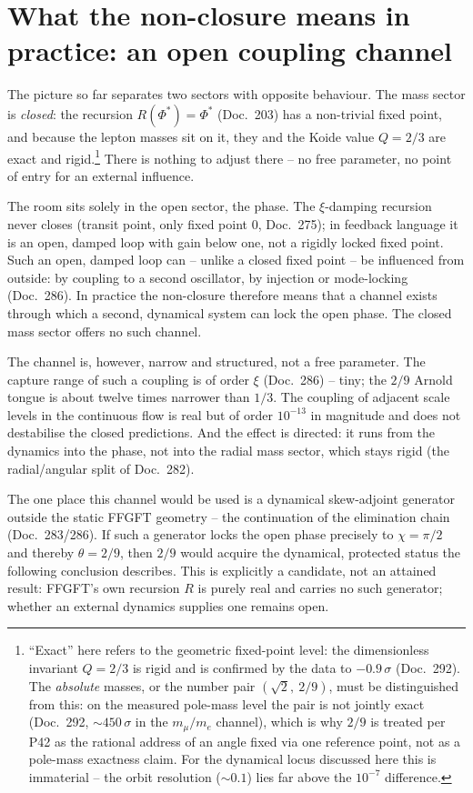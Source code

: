 \section{What the non-closure means in practice: an open coupling channel}
The picture so far separates two sectors with opposite behaviour. The mass sector is
\emph{closed}: the recursion $R(\Phi^*)=\Phi^*$ (Doc.~203) has a non-trivial fixed point, and
because the lepton masses sit on it, they and the Koide value $Q=2/3$ are exact and rigid.\footnote{\enquote{Exact} here refers to the geometric fixed-point level: the dimensionless invariant $Q=2/3$ is rigid and is confirmed by the data to $-0.9\,\sigma$ (Doc.~292). The \emph{absolute} masses, or the number pair $(\sqrt2,\ 2/9)$, must be distinguished from this: on the measured pole-mass level the pair is not jointly exact (Doc.~292, $\sim450\,\sigma$ in the $m_\mu/m_e$ channel), which is why $2/9$ is treated per P42 as the rational address of an angle fixed via one reference point, not as a pole-mass exactness claim. For the dynamical locus discussed here this is immaterial -- the orbit resolution ($\sim0.1$) lies far above the $10^{-7}$ difference.} There
is nothing to adjust there -- no free parameter, no point of entry for an external influence.

The room sits solely in the open sector, the phase. The $\xi$-damping recursion never closes
(transit point, only fixed point $0$, Doc.~275); in feedback language it is an open, damped loop
with gain below one, not a rigidly locked fixed point. Such an open, damped loop can -- unlike a
closed fixed point -- be influenced from outside: by coupling to a second oscillator, by injection
or mode-locking (Doc.~286). In practice the non-closure therefore means that a channel exists
through which a second, dynamical system can lock the open phase. The closed mass sector offers no
such channel.

The channel is, however, narrow and structured, not a free parameter. The capture range of such a
coupling is of order $\xi$ (Doc.~286) -- tiny; the $2/9$ Arnold tongue is about twelve times
narrower than $1/3$. The coupling of adjacent scale levels in the continuous flow is real but of
order $10^{-13}$ in magnitude and does not destabilise the closed predictions. And the effect is
directed: it runs from the dynamics into the phase, not into the radial mass sector, which stays
rigid (the radial/angular split of Doc.~282).

The one place this channel would be used is a dynamical skew-adjoint generator outside the static
FFGFT geometry -- the continuation of the elimination chain (Doc.~283/286). If such a generator
locks the open phase precisely to $\chi=\pi/2$ and thereby $\theta=2/9$, then $2/9$ would acquire
the dynamical, protected status the following conclusion describes. This is explicitly a candidate,
not an attained result: FFGFT's own recursion $R$ is purely real and carries no such generator;
whether an external dynamics supplies one remains open.

